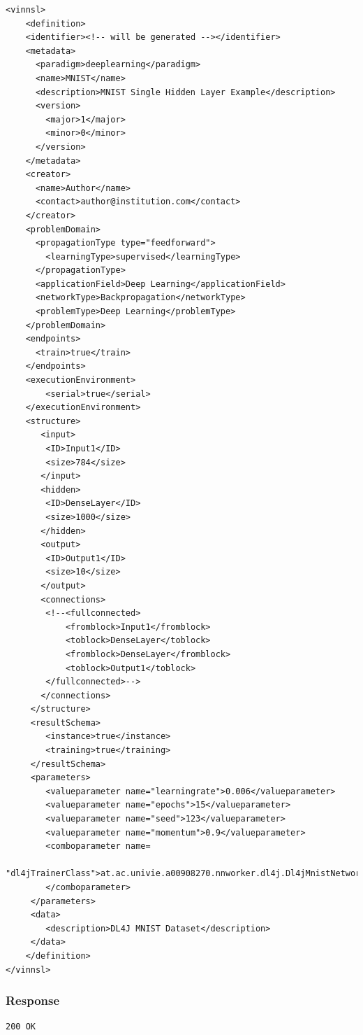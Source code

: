 \begin{verbatim}
<vinnsl>
    <definition>
    <identifier><!-- will be generated --></identifier>
    <metadata>
      <paradigm>deeplearning</paradigm>
      <name>MNIST</name>
      <description>MNIST Single Hidden Layer Example</description>
      <version>
        <major>1</major>
        <minor>0</minor>
      </version>
    </metadata>
    <creator>
      <name>Author</name>
      <contact>author@institution.com</contact>
    </creator>
    <problemDomain>
      <propagationType type="feedforward">
        <learningType>supervised</learningType>
      </propagationType>
      <applicationField>Deep Learning</applicationField>
      <networkType>Backpropagation</networkType>
      <problemType>Deep Learning</problemType>
    </problemDomain>
    <endpoints>
      <train>true</train>
    </endpoints>
    <executionEnvironment>
        <serial>true</serial>
    </executionEnvironment>
    <structure>
       <input>
        <ID>Input1</ID>
        <size>784</size>
       </input>
       <hidden>
        <ID>DenseLayer</ID>
        <size>1000</size>
       </hidden>
       <output>
        <ID>Output1</ID>
        <size>10</size>
       </output>
       <connections>
        <!--<fullconnected>
            <fromblock>Input1</fromblock>
            <toblock>DenseLayer</toblock>
            <fromblock>DenseLayer</fromblock>
            <toblock>Output1</toblock>
        </fullconnected>-->
       </connections>
     </structure>
     <resultSchema>
        <instance>true</instance>
        <training>true</training>
     </resultSchema>
     <parameters>
        <valueparameter name="learningrate">0.006</valueparameter>
        <valueparameter name="epochs">15</valueparameter>
        <valueparameter name="seed">123</valueparameter>
        <valueparameter name="momentum">0.9</valueparameter>
        <comboparameter name=
        "dl4jTrainerClass">at.ac.univie.a00908270.nnworker.dl4j.Dl4jMnistNetworkTrainer
        </comboparameter>
     </parameters>
     <data>
        <description>DL4J MNIST Dataset</description>
     </data>
    </definition>
</vinnsl>
\end{verbatim}

\subsubsection{Response}\label{response-7}

\begin{verbatim}
200 OK
\end{verbatim}

